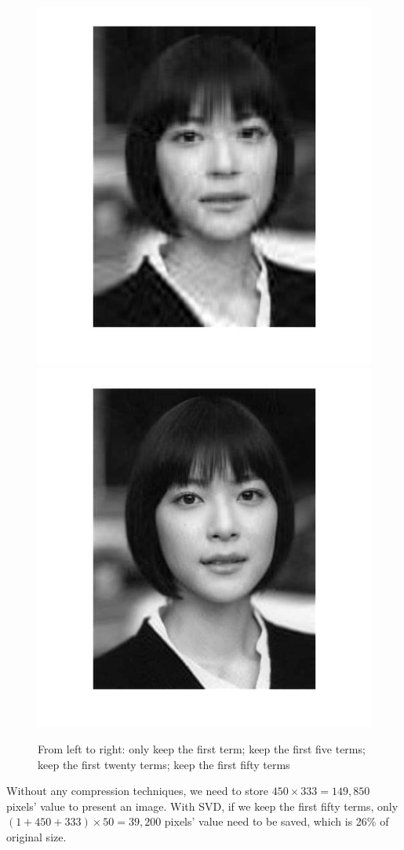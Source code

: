 \documentclass[a4paper]{article}
\theoremstyle{definition}
\theoremstyle{plain}
\begin{document}
\begin{figure}[H]
    \includegraphics[scale=0.12]{figure/uj_20.jpg}
    \includegraphics[scale=0.13]{figure/uj_50.jpg}
    \caption{From left to right: only keep the first term; keep the first five terms; keep the first twenty terms; keep the first fifty terms}
\end{figure}
Without any compression techniques, we need to store $450\times333=149,850$ pixels' value to present an image. With SVD, if we keep the first fifty terms, only $(1+450+333)\times50=39,200$ pixels' value need to be saved, which is 26\% of original size.
\end{document}
